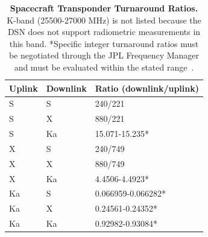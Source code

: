 \begin{table}[htp]
\renewcommand{\arraystretch}{1.5}
\centering
\caption{
    \textbf{Spacecraft Transponder Turnaround Ratios.} K-band (25500-27000 MHz)
    is not listed because the DSN does not support radiometric measurements in
    this band. *Specific integer turnaround ratios must be negotiated through
    the JPL Frequency Manager and must be evaluated within the stated
    range~\cite{Shin2014}.
}
\begin{tabular}{lll}
\hline
\textbf{Uplink} & \textbf{Downlink} & \textbf{Ratio (downlink/uplink)} \\
\hline\hline
S               & S                 & 240/221                          \\
S               & X                 & 880/221                          \\
S               & Ka                & 15.071-15.235*                   \\
X               & S                 & 240/749                          \\
X               & X                 & 880/749                          \\
X               & Ka                & 4.4506-4.4923*                   \\
Ka              & S                 & 0.066959-0.066282*               \\
Ka              & X                 & 0.24561-0.24352*                 \\
Ka              & Ka                & 0.92982-0.93084*                 \\
\hline
\end{tabular}
\end{table}

